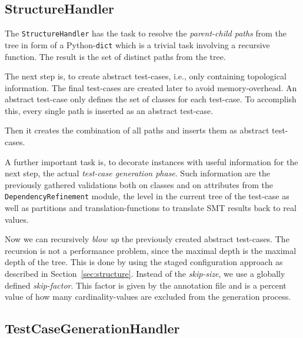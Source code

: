 \subsection*{StructureHandler}
The \verb|StructureHandler| has the task to resolve the \emph{parent-child paths} from the tree in form of a Python-\verb|dict| which is a trivial task involving a recursive function. The result is the set of distinct paths from the tree.

The next step is, to create abstract test-cases, i.e., only containing topological information. The final test-cases are created later to avoid memory-overhead. An abstract test-case only defines the set of classes for each test-case. To accomplish this, every single path is inserted as an abstract test-case. 

Then it creates the combination of all paths and inserts them as abstract test-cases.

A further important task is, to decorate instances with useful information for the next step, the actual \emph{test-case generation phase}. Such information are the previously gathered validations both on classes and on attributes from the \verb|DependencyRefinement| module, the level in the current tree of the test-case as well as partitions and translation-functions to translate SMT results back to real values.

Now we can recursively \emph{blow up} the previously created abstract test-cases. The recursion is not a performance problem, since the maximal depth is the maximal depth of the tree. This is done by using the staged configuration approach as described in Section~\ref{sec:structure}. Instead of the \emph{skip-size}, we use a globally defined \emph{skip-factor}. This factor is given by the annotation file and is a percent value of how many cardinality-values are excluded from the generation process. 


\subsection*{TestCaseGenerationHandler}

